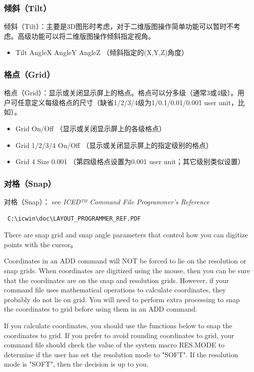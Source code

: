 \subsubsection{倾斜（Tilt）} \label{SectCmdViewTilt}
倾斜（Tilt）：主要是3D图形时考虑，对于二维版图操作简单功能可以暂时不考虑。高级功能可以将二维版图操作倾斜指定视角。
\begin{itemize}
	\item Tilt AngleX AngleY AngleZ  （倾斜指定的(X,Y,Z)角度）
\end{itemize}

\subsubsection{格点（Grid）} \label{SectCmdViewGrid}
格点（Grid）：显示或关闭显示屏上的格点。格点可以分多级（通常3或4级）。用户可任意定义每级格点的尺寸（缺省1/2/3/4级为1/0.1/0.01/0.001 user unit，比如\um）。
\begin{itemize}
	\item Grid On/Off   （显示或关闭显示屏上的各级格点）
	\item Grid 1/2/3/4 On/Off （显示或关闭显示屏上的指定级别的格点）
	\item Grid 4 Size 0.001 （第四级格点设置为0.001 user unit；其它级别类似设置）
\end{itemize}

\subsubsection{对格（Snap）} \label{SectCmdViewSnap}
对格（Snap）： see \emph{ICED™ Command File Programmer's Reference}
\begin{verbatim} C:\icwin\doc\LAYOUT_PROGRAMMER_REF.PDF \end{verbatim} 

There are snap grid and snap angle parameters that control how you can digitize points with the cursor。

Coordinates in an ADD command will NOT be forced to lie on the resolution or
snap grids. When coordinates are digitized using the mouse, then you can be
sure that the coordinates are on the snap and resolution grids. However, if your
command file uses mathematical operations to calculate coordinates, they
probably do not lie on grid. You will need to perform extra processing to snap
the coordinates to grid before using them in an ADD command.

If you calculate coordinates, you should use the functions below to snap the
coordinates to grid. If you prefer to avoid rounding coordinates to grid, your
command file should check the value of the system macro RES.MODE to
determine if the user has set the resolution mode to "SOFT". If the resolution mode is "SOFT", then the decision is up to you.

